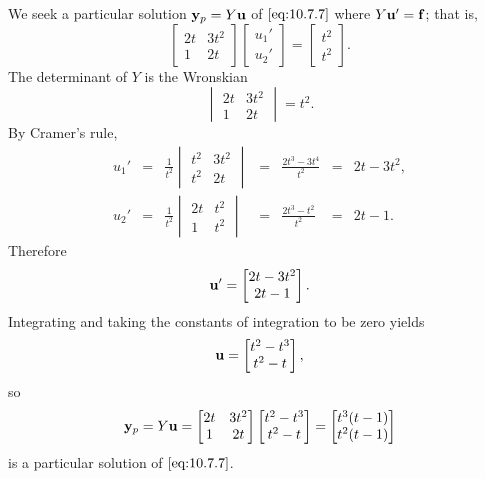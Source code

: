 \documentclass{ximera}
\begin{document}
\begin{example}
\begin{explanation}
We seek a particular solution ${\bf y}_p=Y{\bf u}$ of $\eqref{eq:10.7.7}$
where $Y{\bf u}'={\bf f}$; that is,
$$
\begin{bmatrix}2t&3t^2\\1&2t\end{bmatrix}\begin{bmatrix}u_1'\\u_2'\end{bmatrix}
=\begin{bmatrix}t^2\\t^2\end{bmatrix}.
$$
The determinant of $Y$  is the Wronskian
$$
\begin{vmatrix}2t&3t^2\\1&2t\end{vmatrix}=t^2.
$$
By Cramer's rule,
$$
\begin{array}{ccccccl}
u_1'&=&\frac{1}{t^2}\begin{vmatrix}t^2&3t^2\\t^2&2t
\end{vmatrix}&=&\frac{2t^3-3t^4}{t^2}&=&2t-3t^2,
\\
u_2'&=&\frac{1}{t^2}\begin{vmatrix}2t&t^2\\1&t^2
\end{vmatrix}&=&\frac{2t^3-t^2}{t^2}&=&2t-1.
\end{array}
$$
Therefore
$$
{\bf u}'=\begin{bmatrix}2t-3t^2\\2t-1\end{bmatrix}.
$$
Integrating  and taking the constants of integration to be zero yields
$$
{\bf u}=\begin{bmatrix}t^2-t^3\\t^2-t
\end{bmatrix},
$$
so
$$
{\bf y}_p=Y{\bf u}=
\begin{bmatrix}2t&3t^2\\1&2t\end{bmatrix}
\begin{bmatrix}t^2-t^3\\t^2-t\end{bmatrix}
=\begin{bmatrix}t^3(t-1)\\t^2(t-1)\end{bmatrix}
$$
is a particular solution of  $\eqref{eq:10.7.7}$.
\end{explanation}
\end{example}
\end{document}
